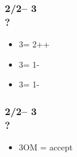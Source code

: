 \documentclass[12pt, a4paper]{article}
\begin{document}
\subsubsection*{2\hearts/2\spades -- 3\clubs \\ ?}
\begin{itemize}
    \item 3\diams = 2++\diams
    \item 3\hearts = 1-\clubs
    \item 3\spades = 1-\diams
\end{itemize}

\subsubsection*{2\hearts/2\spades -- 3\diams \\ ?}
\begin{itemize}
    \item 3OM = accept
\end{itemize}

\end{document}
